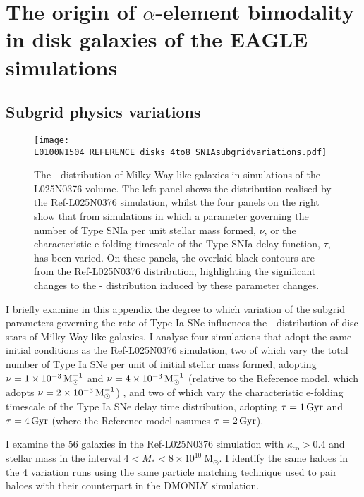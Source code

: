 \chapter{The origin of $\alpha$-element bimodality in disk galaxies of the EAGLE simulations}

\section{Subgrid physics variations}
\label{sec:subgrid}

\begin{figure*}
\texttt{[image: L0100N1504\_REFERENCE\_disks\_4to8\_SNIAsubgridvariations.pdf]}
\caption[The \afe{}-\feh{} distribution of Milky Way like galaxies in L025N0376 under variations of the SNe feedback sub-grid scheme]{\label{fig:subgrid} The \afe{}-\feh{} distribution of Milky Way like galaxies in simulations of the L025N0376 volume. The left panel shows the distribution realised by the Ref-L025N0376 simulation, whilst the four panels on the right show that from simulations in which a parameter governing the number of Type SNIa per unit stellar mass formed, $\nu$, or the characteristic e-folding timescale of the Type SNIa delay function, $\tau$, has been varied. On these panels, the overlaid black contours are from the Ref-L025N0376 distribution, highlighting the significant changes to the \afe{}-\feh{} distribution induced by these parameter changes.}
\end{figure*}

I briefly examine in this appendix the degree to which variation of the subgrid parameters governing the rate of Type Ia SNe influences the \afe{}-\feh{} distribution of disc stars of Milky Way-like galaxies. I analyse four simulations that adopt the same initial conditions as the Ref-L025N0376 simulation, two of which vary the total number of Type Ia SNe per unit of initial stellar mass formed, adopting $\nu = 1\times 10^{-3}\,{\rm M}_{\odot}^{-1}$ and $\nu = 4\times 10^{-3}\,{\rm M}_{\odot}^{-1}$ (relative to the Reference model, which adopts $\nu = 2\times 10^{-3}\,{\rm M}_{\odot}^{-1}$) , and two of which vary the characteristic e-folding timescale of the Type Ia SNe delay time distribution, adopting $\tau = 1\,{\rm Gyr}$ and $\tau = 4\,{\rm Gyr}$ (where the Reference model assumes $\tau = 2\,{\rm Gyr}$).

I examine the 56 galaxies in the Ref-L025N0376 simulation with $\kappa_\mathrm{co} > 0.4$ and stellar mass in the interval $4 < M_* < 8\times10^{10}\ \mathrm{M_{\odot}}$. I identify the same haloes in the 4 variation runs using the same particle matching technique \citep{2015MNRAS.453L..58S} used to pair haloes with their counterpart in the DMONLY simulation.

